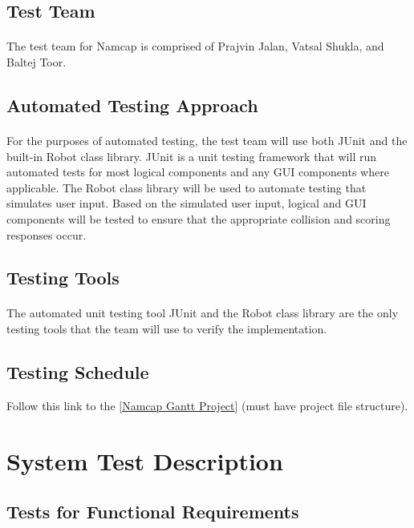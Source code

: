 \documentclass[12pt, titlepage]{article}
\begin{document}
\subsection{Test Team}
\paragraph{}
The test team for Namcap is comprised of Prajvin Jalan, Vatsal Shukla, and Baltej Toor.

\subsection{Automated Testing Approach}
\paragraph{}
For the purposes of automated testing, the test team will use both JUnit and the built-in Robot class library. JUnit is a unit testing framework that will run automated tests for most logical components and any GUI components where applicable. The Robot class library will be used to automate testing that simulates user input. Based on the simulated user input, logical and GUI components will be tested to ensure that the appropriate collision and scoring responses occur.

\subsection{Testing Tools}
\paragraph{}
The automated unit testing tool JUnit and the Robot class library are the only testing tools that the team will use to verify the implementation.

\subsection{Testing Schedule}
		
Follow this link to the [\href{run:../DevelopmentPlan/NamcapGanttProject.gan}{Namcap Gantt Project}] (must have project file structure).

\section{System Test Description}
	
\subsection{Tests for Functional Requirements}
\end{document}

